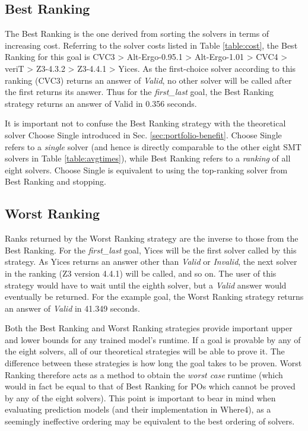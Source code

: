 \subsection{\textsf{Best Ranking}}
\label{sub:best}

The \textsf{Best Ranking} is the one derived from sorting the solvers in terms of increasing cost. 
Referring to the solver costs listed in Table \ref{table:cost}, the \textsf{Best Ranking} for this goal is
CVC3 > Alt-Ergo-0.95.1 > Alt-Ergo-1.01 > CVC4 > veriT > Z3-4.3.2 > Z3-4.4.1 > Yices. 
As the first-choice solver according to this ranking (CVC3) returns an answer of \textit{Valid}, no other solver will be called after the first returns its answer. 
Thus for the \textit{first\_last} goal, the \textsf{Best Ranking} strategy returns an answer of \textsf{Valid} in 0.356 seconds.   

It is important not to confuse the \textsf{Best Ranking} strategy with the theoretical solver \textsf{Choose Single} introduced in Sec. \ref{sec:portfolio-benefit}. 
\textsf{Choose Single} refers to a \textit{single} solver (and hence is directly comparable to the other eight SMT solvers in Table \ref{table:avgtimes}), while \textsf{Best Ranking} refers to a \textit{ranking} of all eight solvers. \textsf{Choose Single} is equivalent to using the top-ranking solver from \textsf{Best Ranking} and stopping.

\subsection{\textsf{Worst Ranking}}
\label{sub:worst}

Ranks returned by the \textsf{Worst Ranking} strategy are the inverse to those from the \textsf{Best Ranking}. 
For the \textit{first\_last} goal, Yices will be the first solver called by this strategy.
As Yices returns an answer other than \textit{Valid} or \textit{Invalid}, the next solver in the ranking (Z3 version 4.4.1) will be called, and so on.
The user of this strategy would have to wait until the eighth solver, but a \textit{Valid} answer would eventually be returned.
For the example goal, the \textsf{Worst Ranking} strategy returns an answer of \textit{Valid} in 41.349 seconds.

Both the \textsf{Best Ranking} and \textsf{Worst Ranking} strategies provide important upper and lower bounds for any trained model's runtime.
If a goal is provable by any of the eight solvers, all of our theoretical strategies will be able to prove it.
The difference between these strategies is how long the goal takes to be proven.  
\textsf{Worst Ranking} therefore acts as a method to obtain the  \textit{worst case} runtime (which would in fact be equal to that of \textsf{Best Ranking} for POs which cannot be proved by any of the eight solvers).
This point is important to bear in mind when evaluating prediction models (and their implementation in \textsf{Where4}), as a seemingly ineffective ordering may be equivalent to the best ordering of solvers. 


